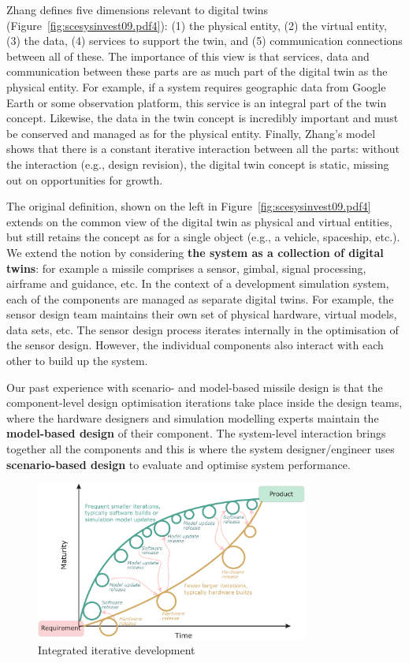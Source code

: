 Zhang \cite{MengZhang2020} defines five dimensions relevant to digital twins (Figure~\ref{fig:scesysinvest09.pdf4}): (1) the physical entity, (2) the virtual entity, (3) the data, (4) services to support the twin, and (5) communication connections between all of these.  The importance of this  view is that services, data and communication between these parts are as much part of the digital twin as the physical entity.  For example, if a system requires geographic data from Google Earth or some observation platform, this service is an integral part of the twin concept. Likewise, the data in the twin concept is incredibly important and must be conserved and managed as for the physical entity. Finally, Zhang's model shows that there is a constant iterative interaction between all the parts: without the interaction (e.g., design revision), the digital twin concept is static, missing out on opportunities for growth.

The original definition, shown on the left in Figure~\ref{fig:scesysinvest09.pdf4} extends on the common view of the digital twin as physical and virtual entities, but still retains the concept as for a single object (e.g., a vehicle, spaceship, etc.). We extend the notion by considering \textbf{the system as a collection of digital twins}: for example a missile comprises a sensor, gimbal, signal processing, airframe and guidance, etc. In the context of a development simulation system, each of the components are managed as separate digital twins. For example, the sensor design team maintains their own set of physical hardware, virtual models, data sets, etc.  The sensor design process iterates internally in the optimisation of the sensor design.  However, the individual components also interact with each other to build up the system.

Our past experience with scenario- and model-based missile design is that the component-level design optimisation iterations take place inside the design teams, where the hardware designers and simulation modelling experts maintain the \textbf{model-based design} of their component.  The system-level interaction brings together all the components and this is where the system designer/engineer uses  \textbf{scenario-based design} to evaluate and optimise system performance.

\begin{figure}[tp]
\centering
\includegraphics[width=0.8\textwidth]{pic/scesysinvest07}
\caption{Integrated iterative development\label{fig:scesysinvest07}}
\end{figure}

